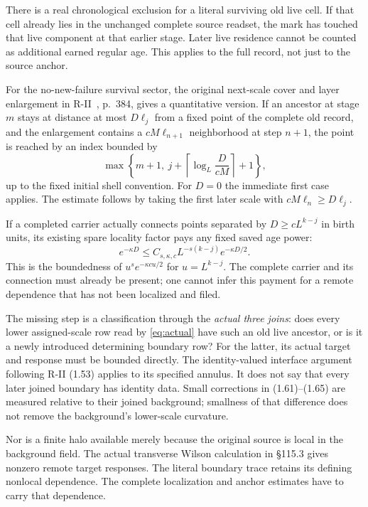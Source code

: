 \documentclass[11pt,letterpaper]{article}
\theoremstyle{plain}
\theoremstyle{remark}\newtheorem{remark}[theorem]{Scope}
\begin{document}
There is a real chronological exclusion for a literal surviving old live
cell. If that cell already lies in the unchanged complete source readset,
the mark has touched that live component at that earlier stage. Later live
residence cannot be counted as additional earned regular age. This applies
to the full record, not just to the source anchor.

For the no-new-failure survival sector, the original next-scale cover and
layer enlargement in R-II~\cite{rii}, p.\ 384, gives a quantitative version. If an
ancestor at stage $m$ stays at distance at most $D\ell_j$ from a fixed
point of the complete old record, and the enlargement contains a
$cM\ell_{n+1}$ neighborhood at step $n+1$, the point is reached by an
index bounded by
\begin{equation}
 \max\left\{m+1,\ j+\left\lceil\log_L\frac{D}{cM}\right\rceil+1\right\},
 \label{eq:firsttouch}
\end{equation}
up to the fixed initial shell convention. For $D=0$ the immediate first
case applies. The estimate follows by taking the first later scale with
$cM\ell_n\ge D\ell_j$.

If a completed carrier actually connects points separated by
$D\ge cL^{k-j}$ in birth units, its existing spare locality factor pays
any fixed saved age power:
\begin{equation}
 e^{-\kappa D}
 \le C_{s,\kappa,c}L^{-s(k-j)}e^{-\kappa D/2}.
\end{equation}
This is the boundedness of $u^se^{-\kappa cu/2}$ for $u=L^{k-j}$.
The complete carrier and its connection must already be present; one
cannot infer this payment for a remote dependence that has not been
localized and filed.

The missing step is a classification through the \emph{actual three joins}:
does every lower assigned-scale row read by \eqref{eq:actual} have such an
old live ancestor, or is it a newly introduced determining boundary row?
For the latter, its actual target and response must be bounded directly.
The identity-valued interface argument following R-II (1.53) applies to
its specified annulus. It does not say that every later joined boundary
has identity data. Small corrections in (1.61)--(1.65) are measured relative
to their joined background; smallness of that difference does not remove
the background's lower-scale curvature.

Nor is a finite halo available merely because the original source is local
in the background field. The actual transverse Wilson calculation in
\S115.3 gives nonzero remote target responses. The literal boundary trace
retains its defining nonlocal dependence. The complete localization and
anchor estimates have to carry that dependence.
\end{document}
